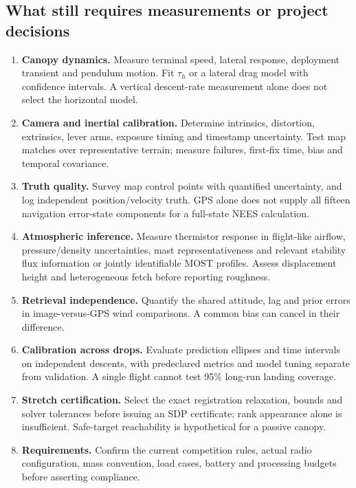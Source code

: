 \documentclass[11pt,a4paper]{article}
\numberwithin{equation}{section}
\begin{document}
\subsection{What still requires measurements or project decisions}
\begin{enumerate}
\item \textbf{Canopy dynamics.} Measure terminal speed, lateral response, deployment transient and pendulum motion. Fit $\tau_h$ or a lateral drag model with confidence intervals. A vertical descent-rate measurement alone does not select the horizontal model.
\item \textbf{Camera and inertial calibration.} Determine intrinsics, distortion, extrinsics, lever arms, exposure timing and timestamp uncertainty. Test map matches over representative terrain; measure failures, first-fix time, bias and temporal covariance.
\item \textbf{Truth quality.} Survey map control points with quantified uncertainty, and log independent position/velocity truth. GPS alone does not supply all fifteen navigation error-state components for a full-state NEES calculation.
\item \textbf{Atmospheric inference.} Measure thermistor response in flight-like airflow, pressure/density uncertainties, mast representativeness and relevant stability flux information or jointly identifiable MOST profiles. Assess displacement height and heterogeneous fetch before reporting roughness.
\item \textbf{Retrieval independence.} Quantify the shared attitude, lag and prior errors in image-versus-GPS wind comparisons. A common bias can cancel in their difference.
\item \textbf{Calibration across drops.} Evaluate prediction ellipses and time intervals on independent descents, with predeclared metrics and model tuning separate from validation. A single flight cannot test 95\% long-run landing coverage.
\item \textbf{Stretch certification.} Select the exact registration relaxation, bounds and solver tolerances before issuing an SDP certificate; rank appearance alone is insufficient. Safe-target reachability is hypothetical for a passive canopy.
\item \textbf{Requirements.} Confirm the current competition rules, actual radio configuration, mass convention, load cases, battery and processing budgets before asserting compliance.
\end{enumerate}
\end{document}
